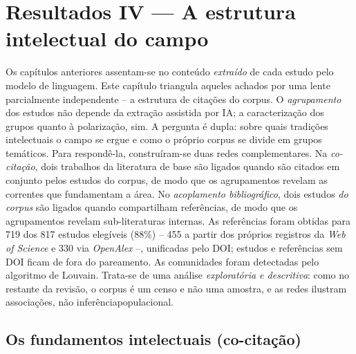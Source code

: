 \chapter{Resultados IV --- A estrutura intelectual do campo}\label{cap:bibliometria}

Os capítulos anteriores assentam-se no conteúdo \emph{extraído} de cada estudo pelo modelo de linguagem. Este capítulo triangula aqueles achados por uma lente parcialmente independente -- a estrutura de citações do corpus. O \emph{agrupamento} dos estudos não depende da extração assistida por IA; a caracterização dos grupos quanto à polarização, sim. A pergunta é dupla: sobre quais tradições intelectuais o campo se ergue e como o próprio corpus se divide em grupos temáticos. Para respondê-la, construíram-se duas redes complementares. Na \emph{co-citação}, dois trabalhos da literatura de base são ligados quando são citados em conjunto pelos estudos do corpus, de modo que os agrupamentos revelam as correntes que fundamentam a área. No \emph{acoplamento bibliográfico}, dois estudos \emph{do corpus} são ligados quando compartilham referências, de modo que os agrupamentos revelam sub-literaturas internas. As referências foram obtidas para 719 dos 817 estudos elegíveis (88\%) -- 455 a partir dos próprios registros da \textit{Web of Science} e 330 via \textit{OpenAlex} --, unificadas pelo DOI; estudos e referências sem DOI ficam de fora do pareamento. As comunidades foram detectadas pelo algoritmo de Louvain. Trata-se de uma análise \emph{exploratória e descritiva}: como no restante da revisão, o corpus é um censo e não uma amostra, e as redes ilustram associações, não inferênciapopulacional.

\section{Os fundamentos intelectuais (co-citação)}

